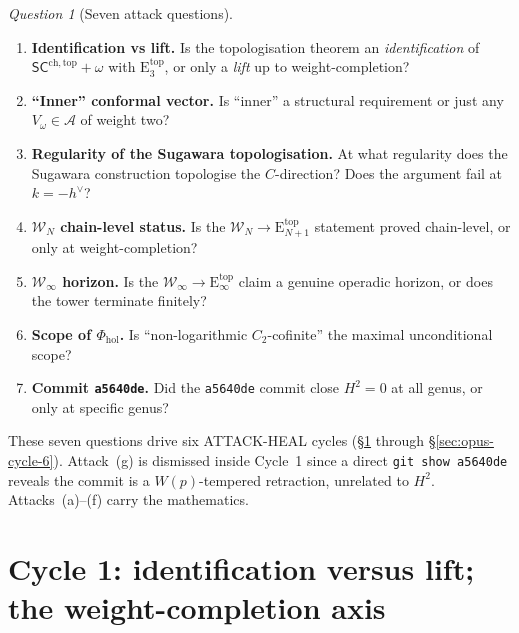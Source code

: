 \documentclass{article}
\theoremstyle{definition}
\theoremstyle{remark}
\newtheorem{question}[theorem]{Question}
\newcommand{\SCchtop}{\mathsf{SC}^{\mathrm{ch,top}}}
\newcommand{\Phihol}{\Phi_{\mathrm{hol}}}
\newcommand{\Etop}[1]{\mathrm{E}_{#1}^{\mathrm{top}}}
\newcommand{\cW}{\mathcal{W}}
\newcommand{\cA}{\mathcal{A}}
\begin{document}
\begin{question}[Seven attack questions]
\label{q:opus-seven}
\begin{enumerate}[label=\textup{(\alph*)}]
\item \textbf{Identification vs lift.} Is the topologisation theorem
an \emph{identification} of $\SCchtop + \omega$ with $\Etop{3}$, or
only a \emph{lift} up to weight-completion?
\item \textbf{``Inner'' conformal vector.} Is ``inner'' a structural
requirement or just any $V_\omega \in \cA$ of weight two?
\item \textbf{Regularity of the Sugawara topologisation.} At what
regularity does the Sugawara construction topologise the
$C$-direction? Does the argument fail at $k=-h^\vee$?
\item \textbf{$\cW_N$ chain-level status.} Is the
$\cW_N \to \Etop{N+1}$ statement proved chain-level, or only at
weight-completion?
\item \textbf{$\cW_\infty$ horizon.} Is the
$\cW_\infty \to \Etop{\infty}$ claim a genuine operadic horizon, or
does the tower terminate finitely?
\item \textbf{Scope of $\Phihol$.} Is
``non-logarithmic $C_2$-cofinite'' the maximal unconditional scope?
\item \textbf{Commit \texttt{a5640de}.} Did the \texttt{a5640de}
commit close $H^2=0$ at all genus, or only at specific genus?
\end{enumerate}
\end{question}

These seven questions drive six ATTACK-HEAL cycles
(\S\ref{sec:opus-cycle-1} through \S\ref{sec:opus-cycle-6}).
Attack~(g) is dismissed inside Cycle~1 since a direct
\texttt{git show a5640de} reveals the commit is a $W(p)$-tempered
retraction, unrelated to $H^2$. Attacks~(a)--(f) carry the
mathematics.

\section{Cycle 1: identification versus lift; the weight-completion axis}
\label{sec:opus-cycle-1}
\end{document}
